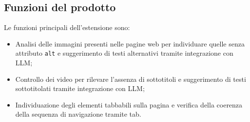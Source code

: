 
\subsection{Funzioni del prodotto}
Le funzioni principali dell'estensione sono:
\begin{itemize}
\item Analisi delle immagini presenti nelle pagine web per individuare quelle senza attributo \texttt{alt} e suggerimento di testi alternativi tramite integrazione con LLM;
\item Controllo dei video per rilevare l'assenza di sottotitoli e suggerimento di testi sottotitolati tramite integrazione con LLM;
\item Individuazione degli elementi tabbabili sulla pagina e verifica della coerenza della sequenza di navigazione tramite tab.
\end{itemize}